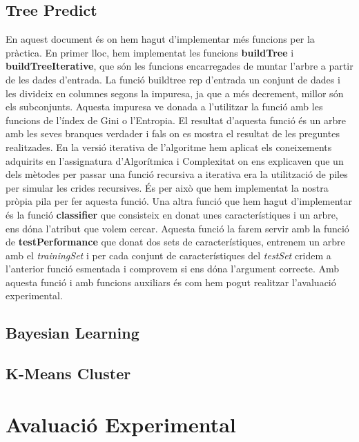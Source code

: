 \documentclass[11pt]{article}
\begin{document}
	\subsection{Tree Predict}
		En aquest document és on hem hagut d'implementar més funcions per la pràctica. En primer lloc, hem implementat les funcions \textbf{buildTree} i \textbf{buildTreeIterative}, que són les funcions encarregades de muntar l'arbre a partir de les dades d'entrada. La funció buildtree rep d'entrada un conjunt de dades i les divideix en columnes segons la impuresa, ja que a més decrement, millor són els subconjunts. Aquesta impuresa ve donada a l'utilitzar la funció amb les funcions de l'índex de Gini o l'Entropia. El resultat d'aquesta funció és un arbre amb les seves branques verdader i fals on es mostra el resultat de les preguntes realitzades. En la versió iterativa de l'algoritme hem aplicat els coneixements adquirits en l'assignatura d'Algorítmica i Complexitat on ens explicaven que un dels mètodes per passar una funció recursiva a iterativa era la utilització de piles per simular les crides recursives. És per això que hem implementat la nostra pròpia pila per fer aquesta funció. Una altra funció que hem hagut d'implementar és la funció \textbf{classifier} que consisteix en donat unes característiques i un arbre, ens dóna l'atribut que volem cercar. Aquesta funció la farem servir amb la funció de \textbf{testPerformance} que donat dos sets de característiques, entrenem un arbre amb el \textit{trainingSet} i per cada conjunt de característiques del \textit{testSet} cridem a l'anterior funció esmentada i comprovem si ens dóna l'argument correcte. Amb aquesta funció i amb funcions auxiliars és com hem pogut realitzar l'avaluació experimental.
		
	\subsection{Bayesian Learning}
		
	\subsection{K-Means Cluster}

\section{Avaluació Experimental}
\end{document}
